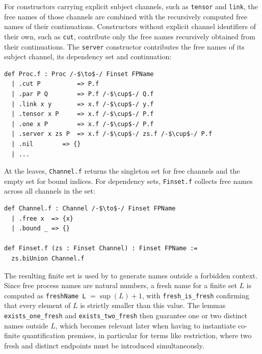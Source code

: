 For constructors carrying explicit subject channels, such as \texttt{tensor} and \texttt{link}, the free names of those channels are combined with the recursively computed free names of their continuations. Constructors without explicit channel identifiers of their own, such as \texttt{cut}, contribute only the free names recursively obtained from their continuations. The \texttt{server} constructor contributes the free names of its subject channel, its dependency set and continuation:

\begin{lstlisting}[language=Lean4]
def Proc.f : Proc /-$\to$-/ Finset FPName
  | .cut P          => P.f
  | .par P Q        => P.f /-$\cup$-/ Q.f
  | .link x y       => x.f /-$\cup$-/ y.f
  | .tensor x P     => x.f /-$\cup$-/ P.f
  | .one x P        => x.f /-$\cup$-/ P.f
  | .server x zs P  => x.f /-$\cup$-/ zs.f /-$\cup$-/ P.f
  | .nil        => {}
  | ...
\end{lstlisting}

At the leaves, \texttt{Channel.f} returns the singleton set for free channels and the empty set for bound indices. For dependency sets, \texttt{Finset.f} collects free names across all channels in the set:

\begin{lstlisting}[language=Lean4]
def Channel.f : Channel /-$\to$-/ Finset FPName
  | .free x  => {x}
  | .bound _ => {}

def Finset.f (zs : Finset Channel) : Finset FPName :=
  zs.biUnion Channel.f
\end{lstlisting}

The resulting finite set is used by  to generate names outside a forbidden context. Since free process names are natural numbers, a fresh name for a finite set $L$ is computed as \texttt{freshName L} $= \sup(L) + 1$, with \texttt{fresh\_is\_fresh} confirming that every element of $L$ is strictly smaller than this value. The lemmas \texttt{exists\_one\_fresh} and \texttt{exists\_two\_fresh} then guarantee one or two distinct names outside $L$, which becomes relevant later when having to instantiate co-finite quantification premises, in particular for terms like restriction, where two fresh and distinct endpoints must be introduced simultaneously.

